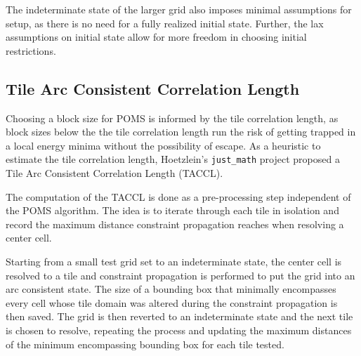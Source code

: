 
The indeterminate state of the larger grid also imposes minimal assumptions for setup,
as there is no need for a fully realized initial state.
Further, the lax assumptions on initial state allow for more freedom
in choosing initial restrictions.



\subsection{Tile Arc Consistent Correlation Length}

Choosing a block size for POMS is informed by the tile correlation length,
as block sizes below the the tile correlation length run the risk of getting
trapped in a local energy minima without the possibility of escape.
As a heuristic to estimate the tile correlation length,
Hoetzlein's \texttt{just\_math} project \cite{Hoetzlein_2023} proposed
a Tile Arc Consistent Correlation Length (TACCL).

The computation of the TACCL is done as a pre-processing step independent of the POMS algorithm.
The idea is to iterate through each tile in isolation and record the maximum distance constraint propagation reaches when resolving a center cell.

Starting from a small test grid set to an indeterminate state,
the center cell is resolved to a tile and constraint propagation is performed to put the grid
into an arc consistent state.
The size of a bounding box that minimally encompasses every cell whose tile domain was altered during the constraint propagation is then saved.
The grid is then reverted to an indeterminate state and the next tile is chosen to resolve, repeating the process and updating the maximum distances
of the minimum encompassing bounding box for each tile tested.

